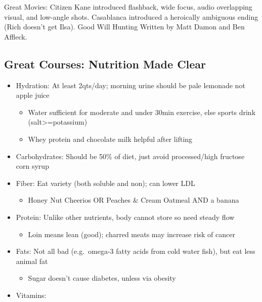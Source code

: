 \documentclass[
]{article}
\providecommand{\tightlist}{%
  \setlength{\itemsep}{0pt}\setlength{\parskip}{0pt}}
\begin{document}
Great Movies: Citizen Kane introduced flashback, wide focus, audio
overlapping visual, and low-angle shots. Casablanca introduced a
heroically ambiguous ending (Rich doesn't get Ilsa). Good Will Hunting
Written by Matt Damon and Ben Affleck.

\hypertarget{great-courses-nutrition-made-clear}{%
\subsection{Great Courses: Nutrition Made
Clear}\label{great-courses-nutrition-made-clear}}

\begin{itemize}
\item
  Hydration: At least 2qts/day; morning urine should be pale lemonade
  not apple juice

  \begin{itemize}
  \item
    Water sufficient for moderate and under 30min exercise, else sports
    drink (salt\textgreater=potassium)
  \item
    Whey protein and chocolate milk helpful after lifting
  \end{itemize}
\item
  Carbohydrates: Should be 50\% of diet, just avoid processed/high
  fructose corn syrup
\item
  Fiber: Eat variety (both soluble and non); can lower LDL

  \begin{itemize}
  \tightlist
  \item
    Honey Nut Cheerios OR Peaches \& Cream Oatmeal AND a banana
  \end{itemize}
\item
  Protein: Unlike other nutrients, body cannot store so need steady flow

  \begin{itemize}
  \tightlist
  \item
    Loin means lean (good); charred meats may increase risk of cancer
  \end{itemize}
\item
  Fats: Not all bad (e.g.~omega-3 fatty acids from cold water fish), but
  eat less animal fat

  \begin{itemize}
  \tightlist
  \item
    Sugar doesn't cause diabetes, unless via obesity
  \end{itemize}
\item
  Vitamins:


\end{itemize}
\end{document}
